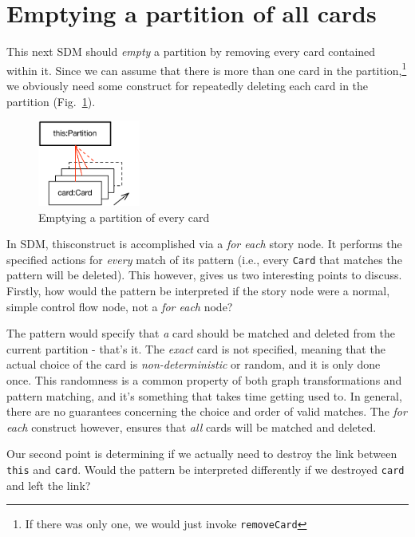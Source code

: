 \newpage
\hypertarget{sec:emptyPartition}{}
\section{Emptying a partition of all cards}
\genHeader

This next SDM should \emph{empty} a partition by removing every card contained within it. Since we can assume that there is more than one card in the
partition,\footnote{If there was only one, we would just invoke \texttt{removeCard}} we obviously need some construct for repeatedly deleting each card in the
partition (Fig.~\ref{fig:goal_empty}). 

\begin{figure}[htbp]
	\centering
  \includegraphics[width=0.3\textwidth]{goal_partitionEmpty.pdf}
	\caption{Emptying a partition of every card}
	\label{fig:goal_empty}
\end{figure}
\FloatBarrier

In SDM, thisconstruct is accomplished via a \emph{for each} story node. It performs the specified actions for \emph{every} match of its
pattern (i.e., every \texttt{Card} that matches the pattern will be deleted). This however, gives us two interesting points to discuss.
Firstly, how would the pattern be interpreted if the story node were a normal, simple control flow node, not a \emph{for each} node?

The pattern would specify that \emph{a} card should be matched and deleted from the current partition - that's it. The \emph{exact} card is not specified,
meaning that the actual choice of the card is \emph{non-deterministic} or random, and it is only done once. This randomness is a common property of both graph
transformations and pattern matching, and it's something that takes time getting used to.  In general, there are no guarantees concerning the choice and
order of valid matches. The \emph{for each} construct however, ensures that \emph{all} cards will be matched and deleted.

Our second point is determining if we actually need to destroy the link between \texttt{this} and \texttt{card}. Would the pattern be interpreted differently if we
destroyed \texttt{card} and left the link?


